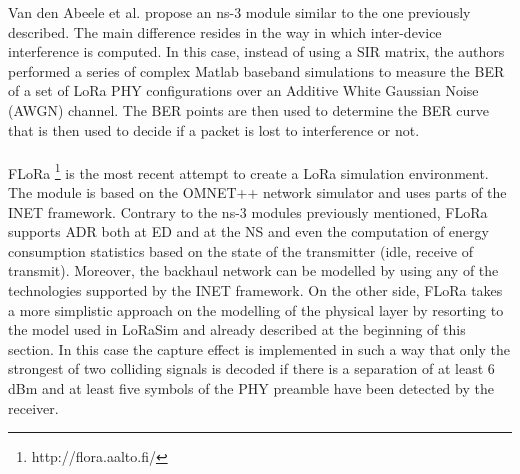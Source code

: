 Van den Abeele et al. \cite{ref:soa-lora-scal4} propose an ns-3 module similar to the one previously described. The main difference resides in the way in which inter-device interference is computed. In this case, instead of using a \gls{SIR} matrix, the authors performed a series of complex Matlab baseband simulations to measure the \gls{BER} of a set of LoRa PHY configurations over an Additive White Gaussian Noise (AWGN) channel. The \gls{BER} points are then used to determine the \gls{BER} curve that is then used to decide if a packet is lost to interference or not. \\\\
FLoRa \footnote{http://flora.aalto.fi/} is the most recent attempt to create a LoRa simulation environment. The module is based on the OMNET++ network simulator and uses parts of the INET framework. Contrary to the ns-3 modules previously mentioned, FLoRa supports \gls{ADR} both at \gls{ED} and at the \gls{NS} and even the computation of energy consumption statistics based on the state of the transmitter (idle, receive of transmit). Moreover, the backhaul network can be modelled by using any of the technologies supported by the INET framework. On the other side, FLoRa takes a more simplistic approach on the modelling of the physical layer by resorting to the model used in LoRaSim and already described at the beginning of this section. In this case the capture effect is implemented in such a way that only the strongest of two colliding signals is decoded if there is a separation of at least 6 dBm and at least five symbols of the PHY preamble have been detected by the receiver.



   
   
